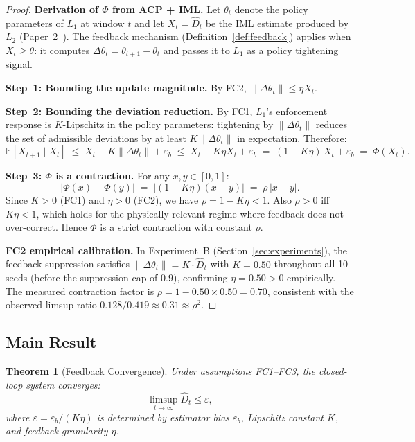 \documentclass[11pt]{article}
\newtheorem{theorem}{Theorem}[section]
\newcommand{\Dhat}{\widehat{D}}
\newcommand{\Layer}[1]{L_{#1}}
\begin{document}
\begin{proof}
\textbf{Derivation of $\Phi$ from ACP + IML.}\enspace
Let $\theta_t$ denote the policy parameters of $\Layer{1}$ at window $t$
and let $X_t = \Dhat_t$ be the IML estimate produced by $\Layer{2}$
(Paper~2~\cite{fernandez2026c}).  The feedback mechanism
(Definition~\ref{def:feedback}) applies when $X_t \ge \theta$: it computes
$\Delta\theta_t = \theta_{t+1} - \theta_t$ and passes it to $\Layer{1}$
as a policy tightening signal.

\textbf{Step~1: Bounding the update magnitude.}\enspace
By FC2, $\|\Delta\theta_t\| \le \eta X_t$.

\textbf{Step~2: Bounding the deviation reduction.}\enspace
By FC1, $\Layer{1}$'s enforcement response is $K$-Lipschitz in the policy
parameters: tightening by $\|\Delta\theta_t\|$ reduces the set of admissible
deviations by at least $K\|\Delta\theta_t\|$ in expectation.  Therefore:
\[
  \mathbb{E}[X_{t+1} \mid X_t]
  \;\le\; X_t - K\|\Delta\theta_t\| + \varepsilon_b
  \;\le\; X_t - K\eta X_t + \varepsilon_b
  \;=\; (1-K\eta)\,X_t + \varepsilon_b
  \;=\; \Phi(X_t).
\]

\textbf{Step~3: $\Phi$ is a contraction.}\enspace
For any $x, y \in [0,1]$:
\[
  |\Phi(x) - \Phi(y)|
  \;=\; |(1-K\eta)(x-y)|
  \;=\; \rho\,|x - y|.
\]
Since $K > 0$ (FC1) and $\eta > 0$ (FC2), we have $\rho = 1 - K\eta < 1$.
Also $\rho > 0$ iff $K\eta < 1$, which holds for the physically relevant
regime where feedback does not over-correct.  Hence $\Phi$ is a strict
contraction with constant $\rho$.

\textbf{FC2 empirical calibration.}\enspace
In Experiment~B (Section~\ref{sec:experiments}), the feedback suppression
satisfies $\|\Delta\theta_t\| = K \cdot \Dhat_t$ with $K = 0.50$
throughout all 10 seeds (before the suppression cap of $0.9$),
confirming $\eta = 0.50 > 0$ empirically.  The measured contraction factor
is $\rho = 1 - 0.50 \times 0.50 = 0.70$, consistent with the observed
limsup ratio $0.128 / 0.419 \approx 0.31 \approx \rho^2$.
\end{proof}

\subsection{Main Result}

\begin{theorem}[Feedback Convergence]
\label{thm:convergence}
Under assumptions FC1--FC3, the closed-loop system converges:
\[
  \limsup_{t \to \infty} \Dhat_t \le \varepsilon,
\]
where $\varepsilon = \varepsilon_b / (K\eta)$ is determined by estimator
bias $\varepsilon_b$, Lipschitz constant $K$, and feedback granularity $\eta$.
\end{theorem}
\end{document}
